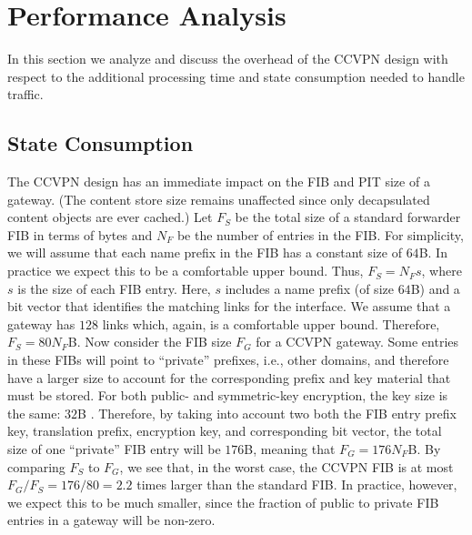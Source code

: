 \section{Performance Analysis}\label{sec:analysis}

In this section we analyze and discuss the overhead of the CCVPN design with respect
to the additional processing time and state consumption needed to handle traffic.

\subsection{State Consumption}
The CCVPN design has an immediate impact on the FIB and PIT size of a gateway.
(The content store size remains unaffected since only decapsulated content objects
are ever cached.) Let $F_S$ be the total size of a standard forwarder
FIB in terms of bytes and
$N_F$ be the number of entries in the FIB. For simplicity, we will assume that
each name prefix in the FIB has a constant size of $64$B. In practice we expect
this to be a comfortable upper bound. Thus, $F_S = N_Fs$, where $s$ is the size of
each FIB entry. Here, $s$ includes a name prefix (of size $64$B) and a bit vector
that identifies the matching links for the interface. We assume that a gateway has
$128$ links which, again, is a comfortable upper bound. Therefore, $F_S = 80N_F$B.
Now consider the FIB size $F_G$ for a CCVPN gateway. Some entries in these FIBs will
point to ``private'' prefixes, i.e., other domains, and therefore have a larger size
to account for the corresponding prefix and key material that must be stored.
For both public- and symmetric-key encryption, the key size is the same: $32$B \cite{sodiumGithub}.
Therefore, by taking into account two both the FIB entry prefix key, translation
prefix, encryption key, and corresponding bit vector, the total size of one ``private''
FIB entry will be $176$B, meaning that $F_G = 176N_F$B. By comparing $F_S$ to $F_G$, we
see that, in the worst case, the CCVPN FIB is at most $F_G/F_S = 176/80 = 2.2$ times larger
than the standard FIB. In practice, however, we expect this to be much smaller, since the
fraction of public to private FIB entries in a gateway will be non-zero.

